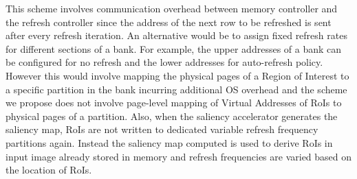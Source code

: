 This scheme involves communication overhead between memory controller and the refresh controller since the address of the next row to be refreshed is sent after every refresh iteration. An alternative would be to assign fixed refresh rates for different sections of a bank. For example, the upper addresses of a bank can be configured for no refresh and the lower addresses for auto-refresh policy. However this would involve mapping the physical pages of a Region of Interest to a specific partition in the bank incurring additional OS overhead and the scheme we propose does not involve page-level mapping of Virtual Addresses of RoIs to physical pages of a partition. Also, when the saliency accelerator generates the saliency map, RoIs are not written to dedicated variable refresh frequency partitions again. Instead the saliency map computed is used to derive RoIs in input image already stored in memory and refresh frequencies are varied based on the location of RoIs. 



